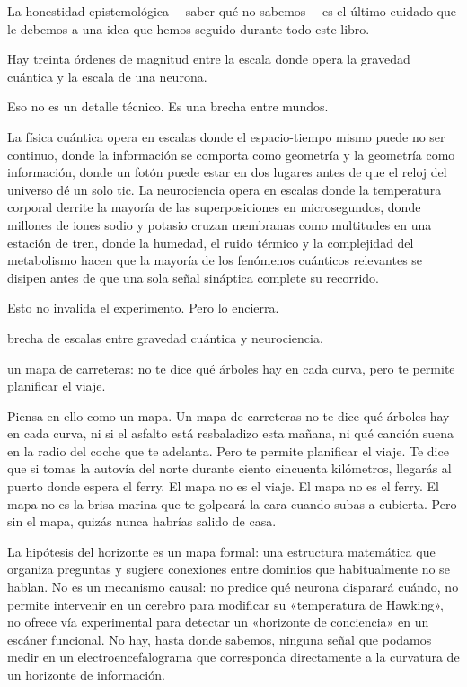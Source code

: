 La honestidad epistemológica —saber qué no sabemos— es el último cuidado que le debemos a una idea que hemos seguido durante todo este libro.

\noindent Hay treinta órdenes de magnitud entre la escala donde opera la gravedad cuántica y la escala de una neurona.

Eso no es un detalle técnico. Es una brecha entre mundos.

La física cuántica opera en escalas donde el espacio-tiempo mismo puede no ser continuo, donde la información se comporta como geometría y la geometría como información, donde un fotón puede estar en dos lugares antes de que el reloj del universo dé un solo tic. La neurociencia opera en escalas donde la temperatura corporal derrite la mayoría de las superposiciones en microsegundos, donde millones de iones sodio y potasio cruzan membranas como multitudes en una estación de tren, donde la humedad, el ruido térmico y la complejidad del metabolismo hacen que la mayoría de los fenómenos cuánticos relevantes se disipen antes de que una sola señal sináptica complete su recorrido.

Esto no invalida el experimento. Pero lo encierra.

\begin{fisica}
 brecha de escalas entre gravedad cuántica y neurociencia.

 un mapa de carreteras: no te dice qué árboles hay en cada curva, pero te permite planificar el viaje.
\end{fisica}
Piensa en ello como un mapa. Un mapa de carreteras no te dice qué árboles hay en cada curva, ni si el asfalto está resbaladizo esta mañana, ni qué canción suena en la radio del coche que te adelanta. Pero te permite planificar el viaje. Te dice que si tomas la autovía del norte durante ciento cincuenta kilómetros, llegarás al puerto donde espera el ferry. El mapa no es el viaje. El mapa no es el ferry. El mapa no es la brisa marina que te golpeará la cara cuando subas a cubierta. Pero sin el mapa, quizás nunca habrías salido de casa.

La hipótesis del horizonte es un mapa formal: una estructura matemática que organiza preguntas y sugiere conexiones entre dominios que habitualmente no se hablan. No es un mecanismo causal: no predice qué neurona disparará cuándo, no permite intervenir en un cerebro para modificar su «temperatura de Hawking», no ofrece vía experimental para detectar un «horizonte de conciencia» en un escáner funcional. No hay, hasta donde sabemos, ninguna señal que podamos medir en un electroencefalograma que corresponda directamente a la curvatura de un horizonte de información.

